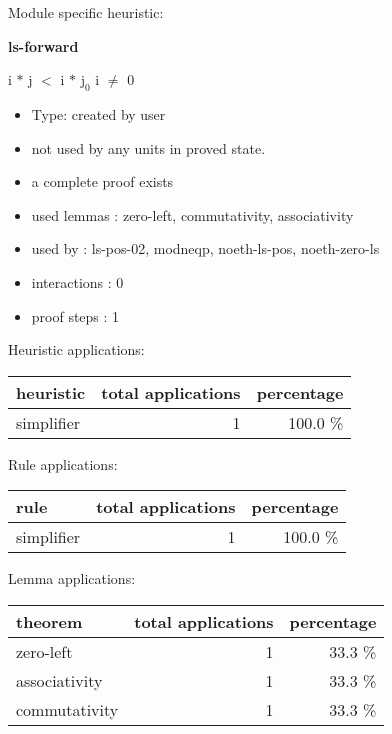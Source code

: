 \documentclass[a4paper]{article}
\begin{document}
Module specific heuristic:

\pagebreak

{\LARGE\bf ls-forward}\label{lemma-ls-forward}

\medskip

 \Fol i $*$ j $<$ i $*$ $\mbox{j}_{0}$ \Imp i $\neq$ 0

\begin{itemize}

\item Type: created by user

\item not used by any units in proved state.
\item       a complete proof exists
\item       used lemmas  : zero-left, commutativity, associativity
\item       used by      : ls-pos-02, modneqp, noeth-ls-pos, noeth-zero-ls
\item       interactions : 0
\item       proof steps  : 1
\end{itemize}

\medskip


Heuristic applications:

\begin{supertabular}{l|r|r}
heuristic	& total applications & percentage \\ \hline
simplifier & 1 & 100.0 \% \\

\end{supertabular}

Rule applications:

\begin{supertabular}{l|r|r}
rule	        & total applications & percentage \\ \hline
simplifier & 1 & 100.0 \% \\

\end{supertabular}

Lemma applications:

\begin{supertabular}{l|r|r}
theorem	        & total applications & percentage \\ \hline
zero-left & 1 & 33.3 \% \\
associativity & 1 & 33.3 \% \\
commutativity & 1 & 33.3 \% \\

\end{supertabular}
\end{document}
